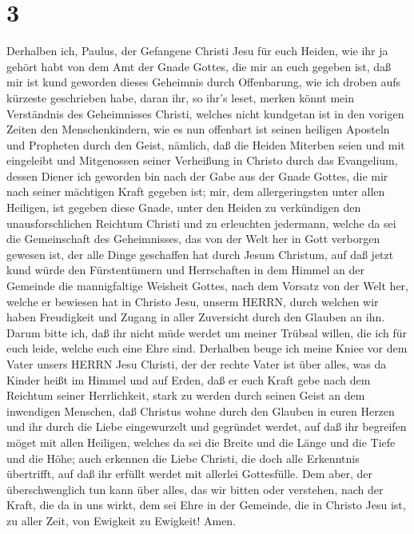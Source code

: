 \hypertarget{section-2}{%
\section{3}\label{section-2}}

 Derhalben ich, Paulus, der Gefangene Christi Jesu für euch
Heiden,  wie ihr ja gehört habt von dem Amt der Gnade
Gottes, die mir an euch gegeben ist,  daß mir ist kund
geworden dieses Geheimnis durch Offenbarung, wie ich droben aufs
kürzeste geschrieben habe,  daran ihr, so ihr's leset,
merken könnt mein Verständnis des Geheimnisses Christi, 
welches nicht kundgetan ist in den vorigen Zeiten den Menschenkindern,
wie es nun offenbart ist seinen heiligen Aposteln und Propheten durch
den Geist,  nämlich, daß die Heiden Miterben seien und mit
eingeleibt und Mitgenossen seiner Verheißung in Christo durch das
Evangelium,  dessen Diener ich geworden bin nach der Gabe
aus der Gnade Gottes, die mir nach seiner mächtigen Kraft gegeben ist;
 mir, dem allergeringsten unter allen Heiligen, ist gegeben
diese Gnade, unter den Heiden zu verkündigen den unausforschlichen
Reichtum Christi  und zu erleuchten jedermann, welche da sei
die Gemeinschaft des Geheimnisses, das von der Welt her in Gott
verborgen gewesen ist, der alle Dinge geschaffen hat durch Jesum
Christum,  auf daß jetzt kund würde den Fürstentümern und
Herrschaften in dem Himmel an der Gemeinde die mannigfaltige Weisheit
Gottes,  nach dem Vorsatz von der Welt her, welche er
bewiesen hat in Christo Jesu, unserm HERRN,  durch welchen
wir haben Freudigkeit und Zugang in aller Zuversicht durch den Glauben
an ihn.  Darum bitte ich, daß ihr nicht müde werdet um
meiner Trübsal willen, die ich für euch leide, welche euch eine Ehre
sind.  Derhalben beuge ich meine Kniee vor dem Vater unsers
HERRN Jesu Christi,  der der rechte Vater ist über alles,
was da Kinder heißt im Himmel und auf Erden,  daß er euch
Kraft gebe nach dem Reichtum seiner Herrlichkeit, stark zu werden durch
seinen Geist an dem inwendigen Menschen,  daß Christus
wohne durch den Glauben in euren Herzen und ihr durch die Liebe
eingewurzelt und gegründet werdet,  auf daß ihr begreifen
möget mit allen Heiligen, welches da sei die Breite und die Länge und
die Tiefe und die Höhe;  auch erkennen die Liebe Christi,
die doch alle Erkenntnis übertrifft, auf daß ihr erfüllt werdet mit
allerlei Gottesfülle.  Dem aber, der überschwenglich tun
kann über alles, das wir bitten oder verstehen, nach der Kraft, die da
in uns wirkt,  dem sei Ehre in der Gemeinde, die in Christo
Jesu ist, zu aller Zeit, von Ewigkeit zu Ewigkeit! Amen.

